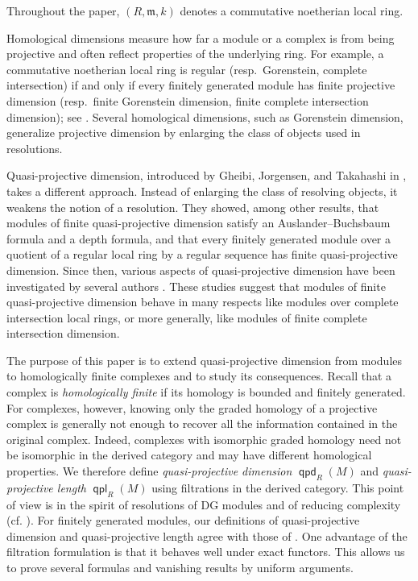 \documentclass[10pt, a4paper,reqno]{amsart}
\theoremstyle{definition}
\theoremstyle{remark}
\numberwithin{equation}{thm}
\def\fm{\mathfrak{m}}
\def\qpd{\operatorname{\mathsf{qpd}}}
\def\qpl{\operatorname{\mathsf{qpl}}}
\begin{document}
Throughout the paper, $(R, \fm ,k)$ denotes a commutative noetherian local ring.

Homological dimensions measure how far a module or a complex is from being projective and often reflect properties of the underlying ring.
For example, a commutative noetherian local ring is regular (resp.~Gorenstein, complete intersection) if and only if every finitely generated module has finite projective dimension (resp.~finite Gorenstein dimension, finite complete intersection dimension); see \cite{AB,AGP,Gbook,CFH,SW}.
Several homological dimensions, such as Gorenstein dimension, generalize projective dimension by enlarging the class of objects used in resolutions.

Quasi-projective dimension, introduced by Gheibi, Jorgensen, and Takahashi in \cite{GJT}, takes a different approach.
Instead of enlarging the class of resolving objects, it weakens the notion of a resolution.
They showed, among other results, that modules of finite quasi-projective dimension satisfy an Auslander--Buchsbaum formula and a depth formula, and that every finitely generated module over a quotient of a regular local ring by a regular sequence has finite quasi-projective dimension.
Since then, various aspects of quasi-projective dimension have been investigated by several authors \cite{FL,JPMMR}.
These studies suggest that modules of finite quasi-projective dimension behave in many respects like modules over complete intersection local rings, or more generally, like modules of finite complete intersection dimension.

The purpose of this paper is to extend quasi-projective dimension from modules to homologically finite complexes and to study its consequences.
Recall that a complex is {\em homologically finite} if its homology is bounded and finitely generated.
For complexes, however, knowing only the graded homology of a projective complex is generally not enough to recover all the information contained in the original complex.
Indeed, complexes with isomorphic graded homology need not be isomorphic in the derived category and may have different homological properties.
We therefore define {\em quasi-projective dimension} $\qpd_R(M)$ and {\em quasi-projective length} $\qpl_R(M)$ using filtrations in the derived category.
This point of view is in the spirit of resolutions of DG modules and of reducing complexity (cf. \cite{Ber1, Ber2, Ker}).
For finitely generated modules, our definitions of quasi-projective dimension and quasi-projective length agree with those of \cite{GJT}.
One advantage of the filtration formulation is that it behaves well under exact functors.
This allows us to prove several formulas and vanishing results by uniform arguments.
\end{document}
